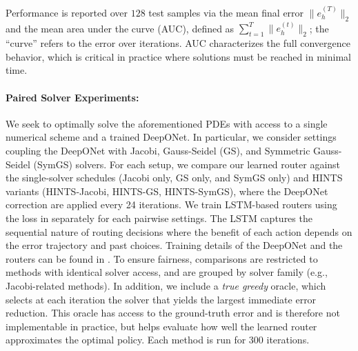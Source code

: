 \documentclass{article}
\begin{document}
Performance is reported over $128$ test samples via the mean final error $\|e^{(T)}_h\|_2$ and the mean area under the curve (AUC), defined as $ \sum_{t = 1}^T\|e^{(t)}_h\|_2$; the ``curve'' refers to the error over iterations. AUC characterizes the full convergence behavior, which is critical in practice where solutions must be reached in minimal time.


\paragraph{Paired Solver Experiments:} We seek to optimally solve the aforementioned PDEs with access to a single numerical scheme and a trained DeepONet. In particular, we consider settings coupling the DeepONet with Jacobi, Gauss-Seidel (GS), and Symmetric Gauss-Seidel (SymGS) solvers. For each setup, we compare our learned router against the single-solver schedules (Jacobi only, GS only, and SymGS only) and HINTS variants (HINTS-Jacobi, HINTS-GS, HINTS-SymGS), where the DeepONet correction are applied every 24 iterations. We train LSTM-based routers using the loss in  separately for each pairwise settings.
The LSTM captures the sequential nature of routing decisions where the benefit of each action depends on the error trajectory and past choices. Training details of the DeepONet and the routers can be found in . To ensure fairness, comparisons are restricted to methods with identical solver access, and are grouped by solver family (e.g., Jacobi-related methods). In addition, we include a \emph{true greedy} oracle, which selects at each iteration the solver that yields the largest immediate error reduction. This oracle has access to the ground-truth error and is therefore not implementable in practice, but helps evaluate how well the learned router approximates the optimal policy. Each method is run for 300 iterations.
\end{document}
